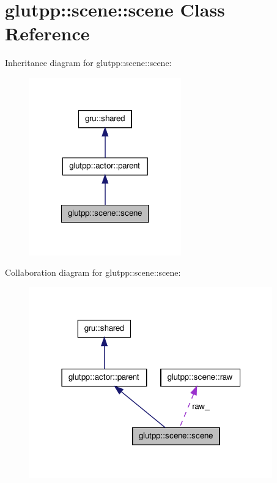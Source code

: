 \hypertarget{classglutpp_1_1scene_1_1scene}{\section{glutpp\-:\-:scene\-:\-:scene \-Class \-Reference}
\label{classglutpp_1_1scene_1_1scene}
}


\-Inheritance diagram for glutpp\-:\-:scene\-:\-:scene\-:
\nopagebreak
\begin{figure}[H]
\begin{center}
\leavevmode
\includegraphics[width=186pt]{classglutpp_1_1scene_1_1scene__inherit__graph}
\end{center}
\end{figure}


\-Collaboration diagram for glutpp\-:\-:scene\-:\-:scene\-:
\nopagebreak
\begin{figure}[H]
\begin{center}
\leavevmode
\includegraphics[width=298pt]{classglutpp_1_1scene_1_1scene__coll__graph}
\end{center}
\end{figure}
